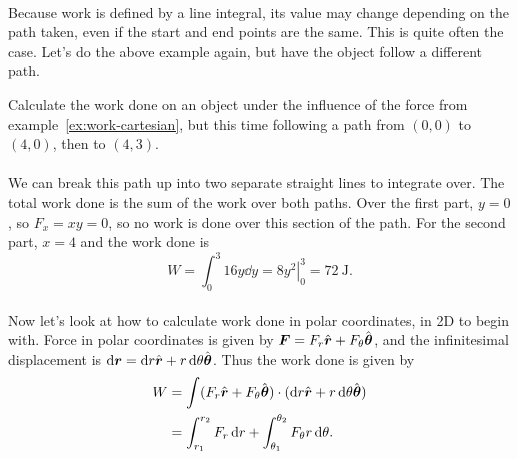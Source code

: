 \documentclass[../classical_mechanics.tex]{subfiles}
\begin{document}
        \paragraph{}
        Because work is defined by a line integral, its value may change depending on the path taken, even if the start and end points are the same.
        This is quite often the case.
        Let's do the above example again, but have the object follow a different path.
        \begin{example}
            Calculate the work done on an object under the influence of the force from example~\ref{ex:work-cartesian}, but this time following a path from $(0,0)$ to $(4,0)$, then to $(4,3)$.

            \paragraph{}
            We can break this path up into two separate straight lines to integrate over.
            The total work done is the sum of the work over both paths.
            Over the first part, $y=0$, so $F_x=xy=0$, so no work is done over this section of the path.
            For the second part, $x=4$ and the work done is
            \begin{equation}
                W=\int_0^3 16y\dd{y}=\left.8y^2\right|_0^3=\qty{72}{\joule}.
            \end{equation}
        \end{example}

        \paragraph{}
        Now let's look at how to calculate work done in polar coordinates, in 2D to begin with.
        Force in polar coordinates is given by $\boldsymbol{F}=F_r\hat{\boldsymbol{r}}+F_\theta\hat{\boldsymbol{\theta}}$, and the infinitesimal displacement is $\dd{\vec{r}}=\dd{r}\uvec{r}+r\dd{\theta}\uvec{\theta}$.
        Thus the work done is given by
        \begin{align}
            W&=\int(F_r\uvec{r}+F_\theta\uvec{\theta})\cdot(\dd{r}\uvec{r}+r\dd{\theta}\uvec{\theta})\\
            &=\int_{r_1}^{r_2}F_r\dd{r}+\int_{\theta_1}^{\theta_2}F_\theta r\dd{\theta}\label{eq:work-integral-2d-polar}.
        \end{align}
        \begin{example}\label{ex:work-polar}
            
        \end{example}
\end{document}
